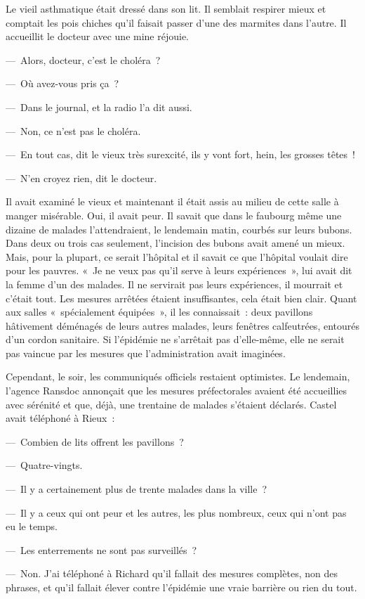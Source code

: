 \documentclass[french,twoside]{book} %
\begin{document}
Le vieil asthmatique était dressé dans son lit. Il semblait respirer mieux et comptait les pois chiches qu’il faisait passer d’une des marmites dans l’autre. Il accueillit le docteur avec une mine réjouie.\par
— Alors, docteur, c’est le choléra ?\par
— Où avez-vous pris ça ?\par
— Dans le journal, et la radio l’a dit aussi.\par
— Non, ce n’est pas le choléra.\par
— En tout cas, dit le vieux très surexcité, ils y vont fort, hein, les grosses têtes !\par
— N’en croyez rien, dit le docteur.\par
Il avait examiné le vieux et maintenant il était assis au milieu de cette salle à manger misérable. Oui, il avait peur. Il savait que dans le faubourg même une dizaine de malades l’attendraient, le lendemain matin, courbés sur leurs bubons. Dans deux ou trois cas seulement, l’incision des bubons avait amené un mieux. Mais, pour la plupart, ce serait l’hôpital et il savait ce que l’hôpital voulait dire pour les pauvres. « Je ne veux pas qu’il serve à leurs expériences », lui avait dit la femme d’un des malades. Il ne servirait pas leurs expériences, il mourrait et c’était tout. Les mesures arrêtées étaient insuffisantes, cela était bien clair. Quant aux salles « spécialement équipées », il les connaissait : deux pavillons hâtivement déménagés de leurs autres malades, leurs fenêtres calfeutrées, entourés d’un cordon sanitaire. Si l’épidémie ne s’arrêtait pas d’elle-même, elle ne serait pas vaincue par les mesures que l’administration avait imaginées.\par
Cependant, le soir, les communiqués officiels restaient optimistes. Le lendemain, l’agence Ransdoc annonçait que les mesures préfectorales avaient été accueillies avec sérénité et que, déjà, une trentaine de malades s’étaient déclarés. Castel avait téléphoné à Rieux :\par
— Combien de lits offrent les pavillons ?\par
— Quatre-vingts.\par
— Il y a certainement plus de trente malades dans la ville ?\par
— Il y a ceux qui ont peur et les autres, les plus nombreux, ceux qui n’ont pas eu le temps.\par
— Les enterrements ne sont pas surveillés ?\par
— Non. J’ai téléphoné à Richard qu’il fallait des mesures complètes, non des phrases, et qu’il fallait élever contre l’épidémie une vraie barrière ou rien du tout.\par
\end{document}
